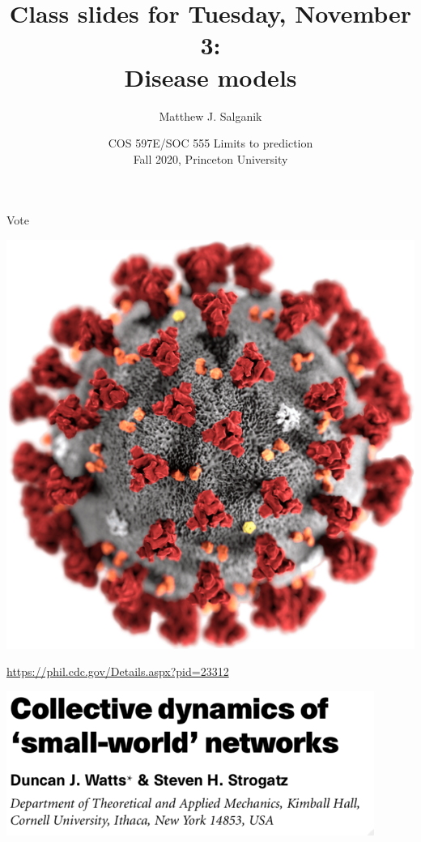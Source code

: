 \documentclass[aspectratio=169]{beamer}
\title[]{Class slides for Tuesday, November 3:\\Disease models}
\author[]{Matthew J. Salganik}
\institute[]{}
\date[]{COS 597E/SOC 555 Limits to prediction\\Fall 2020, Princeton University}
\begin{document}
\frame{\titlepage}
\begin{frame}

\begin{center}
\LARGE{Vote}
\end{center}

\end{frame}
\begin{frame}

\begin{center}
\includegraphics[height = 0.9\textheight]{figures/covid}
\end{center}

\vfill
\tiny{\url{https://phil.cdc.gov/Details.aspx?pid=23312}}
\end{frame}
\begin{frame}

\begin{center}
\includegraphics[width = 0.9\textwidth]{figures/watts_collective_1998_title}
\end{center}

\end{frame}
\end{document}
